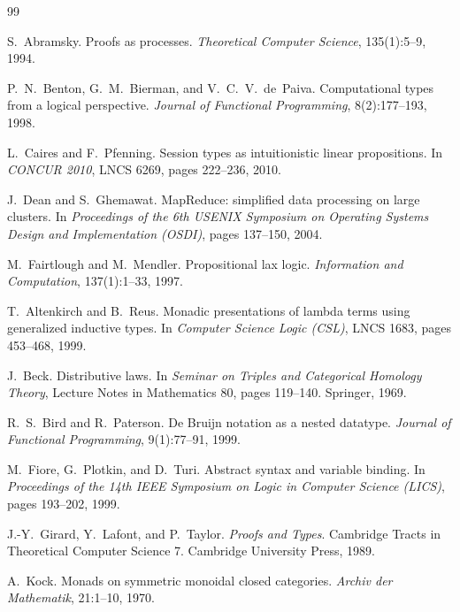\documentclass[11pt]{article}
\theoremstyle{definition}
\theoremstyle{plain}
\theoremstyle{remark}
\begin{document}
\begin{thebibliography}{99}\small\raggedright

S.~Abramsky.
\newblock Proofs as processes.
\newblock \emph{Theoretical Computer Science}, 135(1):5--9, 1994.

P.~N.~Benton, G.~M.~Bierman, and V.~C.~V.~de~Paiva.
\newblock Computational types from a logical perspective.
\newblock \emph{Journal of Functional Programming}, 8(2):177--193, 1998.

L.~Caires and F.~Pfenning.
\newblock Session types as intuitionistic linear propositions.
\newblock In \emph{CONCUR 2010}, LNCS 6269, pages 222--236, 2010.

J.~Dean and S.~Ghemawat.
\newblock MapReduce: simplified data processing on large clusters.
\newblock In \emph{Proceedings of the 6th USENIX Symposium on Operating Systems
Design and Implementation (OSDI)}, pages 137--150, 2004.

M.~Fairtlough and M.~Mendler.
\newblock Propositional lax logic.
\newblock \emph{Information and Computation}, 137(1):1--33, 1997.

T.~Altenkirch and B.~Reus.
\newblock Monadic presentations of lambda terms using generalized inductive
types.
\newblock In \emph{Computer Science Logic (CSL)}, LNCS 1683, pages 453--468,
1999.

J.~Beck.
\newblock Distributive laws.
\newblock In \emph{Seminar on Triples and Categorical Homology Theory}, Lecture
Notes in Mathematics 80, pages 119--140. Springer, 1969.

R.~S.~Bird and R.~Paterson.
\newblock De Bruijn notation as a nested datatype.
\newblock \emph{Journal of Functional Programming}, 9(1):77--91, 1999.

M.~Fiore, G.~Plotkin, and D.~Turi.
\newblock Abstract syntax and variable binding.
\newblock In \emph{Proceedings of the 14th IEEE Symposium on Logic in Computer
Science (LICS)}, pages 193--202, 1999.

J.-Y.~Girard, Y.~Lafont, and P.~Taylor.
\newblock \emph{Proofs and Types}.
\newblock Cambridge Tracts in Theoretical Computer Science 7. Cambridge
University Press, 1989.

A.~Kock.
\newblock Monads on symmetric monoidal closed categories.
\newblock \emph{Archiv der Mathematik}, 21:1--10, 1970.


\end{thebibliography}
\end{document}
